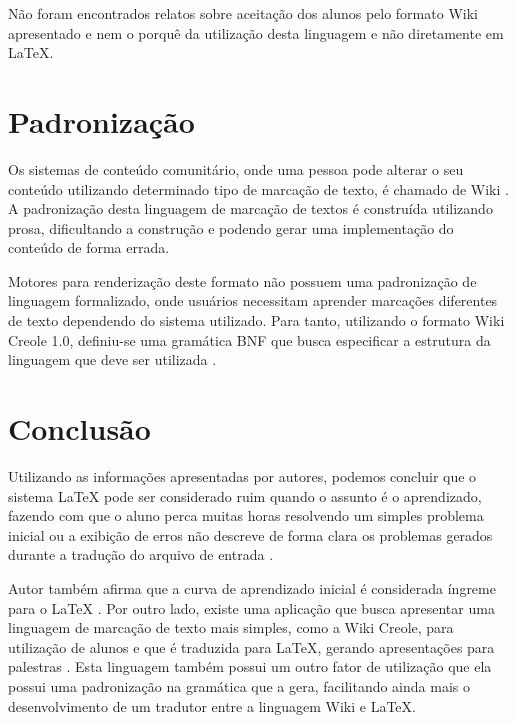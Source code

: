 \documentclass{article}
\begin{document}
Não foram encontrados relatos sobre aceitação dos alunos pelo formato Wiki
apresentado e nem o porquê da utilização desta linguagem e não diretamente em
\LaTeX{}.

\section{Padronização}
\label{sec:padro}

Os sistemas de conteúdo comunitário, onde uma pessoa pode alterar o seu conteúdo
utilizando determinado tipo de marcação de texto, é chamado de Wiki
\cite{junghans20081}. A padronização desta linguagem de marcação de textos é
construída utilizando prosa, dificultando a construção e podendo gerar uma
implementação do conteúdo de forma errada.

Motores para renderização deste formato não possuem uma padronização de
linguagem formalizado, onde usuários necessitam aprender marcações diferentes de
texto dependendo do sistema utilizado. Para tanto, utilizando o formato Wiki
Creole 1.0, definiu-se uma gramática BNF que busca especificar a estrutura da
linguagem que deve ser utilizada \cite{junghans20081,junghans20082}.

\section{Conclusão}
\label{sec:concl}

Utilizando as informações apresentadas por autores, podemos concluir que o
sistema \LaTeX{} pode ser considerado ruim quando o assunto é o aprendizado,
fazendo com que o aluno perca muitas horas resolvendo um simples problema
inicial \cite{gray2003} ou a exibição de erros não descreve de forma clara os
problemas gerados durante a tradução do arquivo de entrada \cite{ha2007}.

Autor também afirma que a curva de aprendizado inicial é considerada íngreme
para o \LaTeX{} \cite{salzberg2005}. Por outro lado, existe uma aplicação que
busca apresentar uma linguagem de marcação de texto mais simples, como a Wiki
Creole, para utilização de alunos e que é traduzida para \LaTeX{}, gerando
apresentações para palestras \cite{oneill2005}. Esta linguagem também possui um
outro fator de utilização que ela possui uma padronização na gramática que a
gera, facilitando ainda mais o desenvolvimento de um tradutor entre a linguagem
Wiki e \LaTeX{}.
\end{document}
